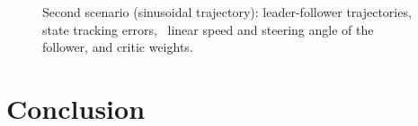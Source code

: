 \documentclass[conference]{IEEEtran}
\begin{document}
\begin{figure}[htbp]
    \caption[Leader-follower performance for nonlinear trajectory.]{Second scenario (sinusoidal trajectory): 
         leader-follower trajectories,~ state tracking errors,~ linear speed and steering angle of the follower, and     critic weights.}%
    \label{fig:performanceSinewaveTrajectory}%
\end{figure}
%




%
%


\section{Conclusion} \label{sec:conclusion}
\end{document}
